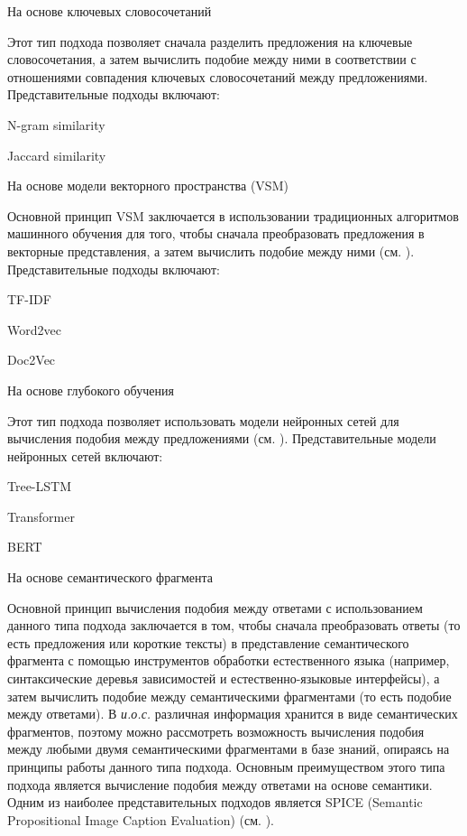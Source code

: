 \begin{textitemize}
	\item На основе ключевых словосочетаний
	
	Этот тип подхода позволяет сначала разделить предложения на ключевые словосочетания, а затем вычислить подобие между ними в соответствии с отношениями совпадения ключевых словосочетаний между предложениями. Представительные подходы включают:
	
	\begin{textitemize}
		\item N-gram similarity
		\item Jaccard similarity
	\end{textitemize}
	
	\item На основе модели векторного пространства (VSM)
	
	Основной принцип VSM заключается в использовании традиционных алгоритмов машинного обучения для того, чтобы сначала преобразовать предложения в векторные представления, а затем вычислить подобие между ними (см. ). Представительные подходы включают:
	
	\begin{textitemize}
		\item TF-IDF
		\item Word2vec
		\item Doc2Vec
	\end{textitemize}
	
	\item На основе глубокого обучения
	
	Этот тип подхода позволяет использовать модели нейронных сетей для вычисления подобия между предложениями (см. ). Представительные модели нейронных сетей включают:
	
	\begin{textitemize}
		\item Tree-LSTM
		\item Transformer
		\item BERT
	\end{textitemize}
	
	\item На основе семантического фрагмента
	
	Основной принцип вычисления подобия между ответами с использованием данного типа подхода заключается в том, чтобы сначала преобразовать ответы (то есть предложения или короткие тексты) в представление семантического фрагмента с помощью инструментов обработки естественного языка (например, синтаксические деревья зависимостей и естественно-языковые интерфейсы), а затем вычислить подобие между семантическими фрагментами (то есть подобие между ответами). В \textit{и.о.с.} различная информация хранится в виде семантических фрагментов, поэтому можно рассмотреть возможность вычисления подобия между любыми двумя семантическими фрагментами в базе знаний, опираясь на принципы работы данного типа подхода. Основным преимуществом этого типа подхода является вычисление подобия между ответами на основе семантики. Одним из наиболее представительных подходов является SPICE (Semantic Propositional Image Caption Evaluation) (см. ). 
	

\end{textitemize}
